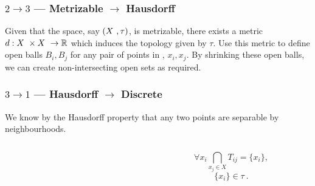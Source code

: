 \begin{frame}
    \frametitle{\(2 \rightarrow 3\) --- Metrizable \(\rightarrow\) Hausdorff}

    Given that the space, say \((X~, \tau)\), is metrizable, there exists a
    metric \(d: X~ \times X~ \to \mathbb{R}\) which induces the topology given
    by \(\tau\). \pause
    Use this metric to define open balls \(B_i, B_j\) for any pair of points in
    \topx, \(x_i, x_j\). \pause By shrinking these open balls, we can create
    non-intersecting open sets as required.
    \pause
    \begin{figure}
        \scalebox{1}{}
    \end{figure}

\end{frame}

\begin{frame}
    \frametitle{\(3 \rightarrow 1\) --- Hausdorff \(\rightarrow\) Discrete}

    We know by the Hausdorff property that any two points are separable by
    neighbourhoods.

    \pause


    \begin{columns}
        \begin{column}{0.5\textwidth}
            \begin{figure}
                \scalebox{1}{}
            \end{figure}
        \end{column}
        \begin{column}{0.5\textwidth}
            \pause
            \begin{equation*}
                \forall x_i \bigcap_{x_j\in X} T_{ij} = \{x_i\},
            \end{equation*}\pause
            \begin{equation*}
                \{x_i\} \in \tau~.
            \end{equation*}     
        \end{column}
    \end{columns}


\end{frame}

